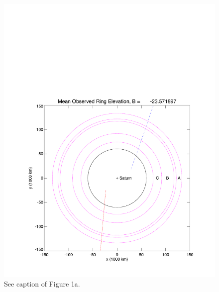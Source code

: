 \documentclass[crop=false,class=book]{standalone}
\begin{document}
\begin{figure}[H]
    \centering
    \includegraphics[page=3,trim = {0.8in 0.5in 0.21in 0.45in},clip,width=\textwidth]{Rev007_E_X43_summary_p1_08FEB2018.pdf}
    \caption{See caption of Figure 1a.}
\end{figure}
\end{document}
